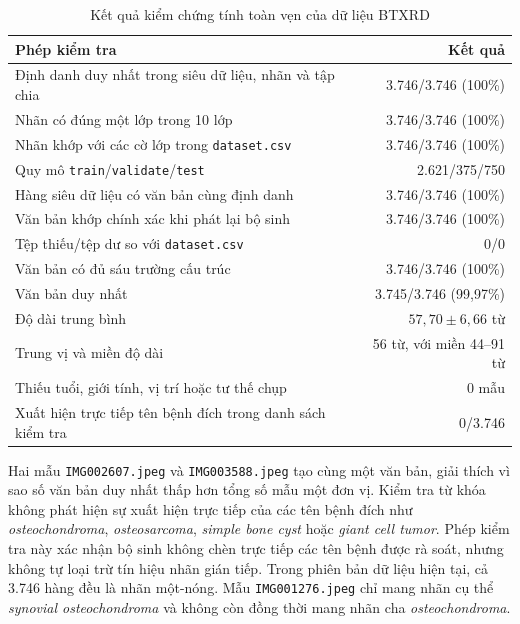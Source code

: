 \begin{table}[H]
\centering
\small
\begin{tabular}{|L{8.2cm}|r|}
\hline
\textbf{Phép kiểm tra} & \textbf{Kết quả} \\ \hline
Định danh duy nhất trong siêu dữ liệu, nhãn và tập chia & 3.746/3.746 (100\%) \\ \hline
Nhãn có đúng một lớp trong 10 lớp & 3.746/3.746 (100\%) \\ \hline
Nhãn khớp với các cờ lớp trong \texttt{dataset.csv} & 3.746/3.746 (100\%) \\ \hline
Quy mô \texttt{train}/\texttt{validate}/\texttt{test} & 2.621/375/750 \\ \hline
Hàng siêu dữ liệu có văn bản cùng định danh & 3.746/3.746 (100\%) \\ \hline
Văn bản khớp chính xác khi phát lại bộ sinh & 3.746/3.746 (100\%) \\ \hline
Tệp thiếu/tệp dư so với \texttt{dataset.csv} & 0/0 \\ \hline
Văn bản có đủ sáu trường cấu trúc & 3.746/3.746 (100\%) \\ \hline
Văn bản duy nhất & 3.745/3.746 (99,97\%) \\ \hline
Độ dài trung bình & $57{,}70 \pm 6{,}66$ từ \\ \hline
Trung vị và miền độ dài & 56 từ, với miền 44--91 từ \\ \hline
Thiếu tuổi, giới tính, vị trí hoặc tư thế chụp & 0 mẫu \\ \hline
Xuất hiện trực tiếp tên bệnh đích trong danh sách kiểm tra & 0/3.746 \\ \hline
\end{tabular}
\caption{Kết quả kiểm chứng tính toàn vẹn của dữ liệu BTXRD}
\label{tab:appendix-btxrd-text-verification}
\end{table}

Hai mẫu \texttt{IMG002607.jpeg} và \texttt{IMG003588.jpeg} tạo cùng một văn bản, giải thích vì sao số văn bản duy nhất thấp hơn tổng số mẫu một đơn vị. Kiểm tra từ khóa không phát hiện sự xuất hiện trực tiếp của các tên bệnh đích như \textit{osteochondroma}, \textit{osteosarcoma}, \textit{simple bone cyst} hoặc \textit{giant cell tumor}. Phép kiểm tra này xác nhận bộ sinh không chèn trực tiếp các tên bệnh được rà soát, nhưng không tự loại trừ tín hiệu nhãn gián tiếp. Trong phiên bản dữ liệu hiện tại, cả 3.746 hàng đều là nhãn một-nóng. Mẫu \texttt{IMG001276.jpeg} chỉ mang nhãn cụ thể \textit{synovial osteochondroma} và không còn đồng thời mang nhãn cha \textit{osteochondroma}.

